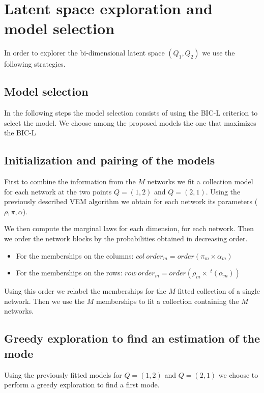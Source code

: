 \documentclass[12pt,a4paper]{report}
\begin{document}
\section{Latent space exploration and model selection}
\label{sec:latent-space-exploration-and-model-selection}
In order to explorer the bi-dimensional latent space $(Q_1,Q_2)$
we use the following strategies.

\subsection{Model selection}
\label{ssec:model-selection}
In the following steps the model selection consists of using the BIC-L
criterion to select the model. We choose among the proposed models the one that
maximizes the BIC-L

\subsection{Initialization and pairing of the models}
\label{ssec:initialization-and-pairing-of-the-models}
First to combine the information from the $M$ networks we fit a collection model
for each network at the two points $Q = (1, 2)$ and $Q = (2, 1)$. Using the
previously described VEM algorithm we obtain for each network its parameters
($\rho,\pi,\alpha$).

We then compute the marginal laws for each dimension, for each network. Then
we order the network blocks by the probabilities obtained in decreasing order.
\begin{itemize}
    \item For the memberships on the columns:
          $col~order_m = order\left(\pi_m \times \alpha_m\right)$
    \item For the memberships on the rows:
          $row~order_m = order\left(\rho_m \times ~^{t}(\alpha_m)\right)$
\end{itemize}

Using this order we relabel the memberships for the $M$ fitted collection of a
single network.
Then we use the $M$ memberships to fit a collection containing the $M$ networks.
\subsection{Greedy exploration to find an estimation of the mode}
\label{ssec:greedy-exploration-to-find-an-estimation-of-the-mode}
Using the previously fitted models for $Q = (1,2)$ and $Q = (2,1)$ we choose to
perform a greedy exploration to find a first mode.
\end{document}
